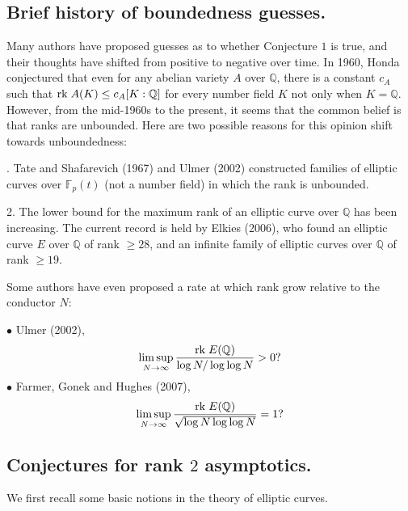 \documentclass[12pt,reqno]{amsart}
\numberwithin{equation}{section}
\def\Q{{\mathbb Q}}
\def\F{{\mathbb F}}
\begin{document}
\subsection{Brief history of boundedness guesses.}

Many authors have proposed guesses as to whether Conjecture $1$ is true, and their thoughts have shifted from positive to negative over time. In 1960, Honda conjectured that even for any abelian variety $A$ over $\Q$, there is a constant $c_A$ such that ${\rm rk }\; A(K) \le c_A[K:\Q]$ for every number field $K$ not only when $K = \Q$. However, from the mid-1960s to the present, it seems that the common belief is that ranks are unbounded. Here are two possible reasons for this opinion shift towards unboundedness:

. Tate and Shafarevich (1967) and Ulmer (2002) constructed families of elliptic curves over $\F_p(t)$ (not a number field) in which the rank is unbounded.

 2. The lower bound for the maximum rank of an elliptic curve over $\Q$ has been increasing. The current record is held by Elkies (2006), who found an elliptic curve $E$ over $\Q$ of rank $\ge 28$, and an infinite family of elliptic curves over $\Q$ of rank $\ge 19$.

\smallskip

Some authors have even proposed a rate at which rank grow relative to the conductor $N$:

\indent $\bullet$ Ulmer (2002),
$$
\limsup_{N \to \infty} \frac{ {\rm rk }\; E(\Q) } { \log N/ \log \log N} > 0?
$$
\indent $\bullet$ Farmer, Gonek and Hughes (2007),
$$
\limsup_{N \to \infty} \frac{ {\rm rk }\; E(\Q) } { \sqrt{\log N \log \log N}} = 1?
$$

\vspace{2mm}

\subsection{Conjectures for rank $2$ asymptotics.}

We first recall some basic notions in the theory of elliptic curves.
\end{document}
